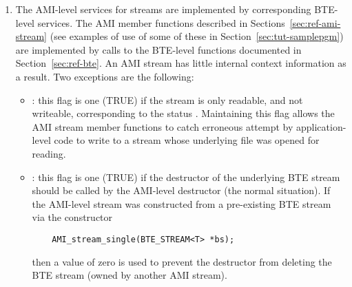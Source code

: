 \begin{itemize}
\begin{enumerate}
        \item The AMI-level services for streams are
        implemented by corresponding BTE-level services. The
        AMI member functions described in
        Sections~\ref{sec:ref-ami-stream} (see examples of
        use of some of these in Section~\ref{sec:tut-samplepgm})
        are implemented by calls to the BTE-level functions
        documented in Section~\ref{sec:ref-bte}. An AMI
        stream has little internal context information as a
        result. Two exceptions are the following:
        \begin{itemize}
            \item {}: this flag is one (TRUE) if
            the stream is only readable, and not writeable,
            corresponding to the status
            . Maintaining this flag
            allows the AMI stream member functions to catch
            erroneous attempt by application-level code to
            write to a stream whose underlying file was
            opened for reading.
            
            \item {}: this flag is one
            (TRUE) if the destructor of the underlying BTE
            stream should be called by the AMI-level
            destructor (the normal situation). If the
            AMI-level stream was constructed from a
            pre-existing BTE stream via the constructor
\begin{verbatim}
    AMI_stream_single(BTE_STREAM<T> *bs);
\end{verbatim}
            then a  value of zero is used
            to prevent the destructor from deleting the BTE
            stream (owned by another AMI stream).
        \end{itemize}
    \end{enumerate}

\end{itemize}



